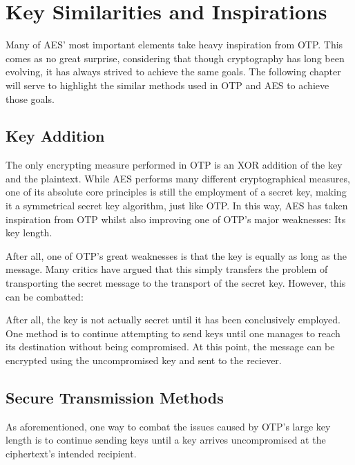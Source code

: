 \documentclass[12pt, a4paper]{report}
\theoremstyle{definition}
\theoremstyle{remark}
\begin{document}
\section{Key Similarities and Inspirations}
Many of AES' most important elements take heavy inspiration from OTP. This comes as no great surprise, considering that though cryptography has long been evolving, it has always strived to achieve the same goals. The following chapter will serve to highlight the similar methods used in OTP and AES to achieve those goals.

\subsection{Key Addition}
The only encrypting measure performed in OTP is an XOR addition of the key and the plaintext. While AES performs many different cryptographical measures, one of its absolute core principles is still the employment of a secret key, making it a symmetrical secret key algorithm, just like OTP. In this way, AES has taken inspiration from OTP whilst also improving one of OTP's major weaknesses: Its key length.

After all, one of OTP's great weaknesses is that the key is equally as long as the message. Many critics have argued that this simply transfers the problem of transporting the secret message to the transport of the secret key. However, this can be combatted:

After all, the key is not actually secret until it has been conclusively employed. One method is to continue attempting to send keys until one manages to reach its destination without being compromised. At this point, the message can be encrypted using the uncompromised key and sent to the reciever.

\subsection{Secure Transmission Methods}
As aforementioned, one way to combat the issues caused by OTP's large key length is to continue sending keys until a key arrives uncompromised at the ciphertext's intended recipient.

\begin{center}
\end{center}
\end{document}
